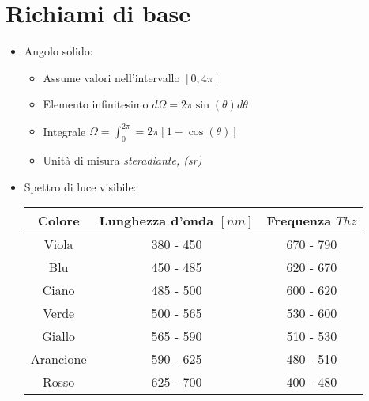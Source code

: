 \documentclass[9pt]{extarticle}
\begin{document}
\section{Richiami di base}
\begin{itemize}
  \item Angolo solido:
        \begin{itemize}
          \item Assume valori nell'intervallo \( [0, 4 \pi] \)
          \item Elemento infinitesimo \( d \Omega = 2 \pi \sin(\theta) d \theta \)
          \item Integrale \( \displaystyle \Omega = \int_0^{2 \pi} = 2 \pi \left[  1- \cos(\theta) \right] \)
          \item Unità di misura \textit{steradiante, (sr)}
        \end{itemize}
  \item Spettro di luce visibile:
        \vspace{0.5cm}
        \begin{table}[h]
          \centering
          \renewcommand{\arraystretch}{2}
          \begin{tabular}{|c|c|c|}
            \hline
            \textbf{Colore} & \textbf{Lunghezza d'onda \([nm]\)} & \textbf{Frequenza \(Thz\)} \\ \hline
            Viola           & 380 - 450                          & 670 - 790                  \\ \hline
            Blu             & 450 - 485                          & 620 - 670                  \\ \hline
            Ciano           & 485 - 500                          & 600 - 620                  \\ \hline
            Verde           & 500 - 565                          & 530 - 600                  \\ \hline
            Giallo          & 565 - 590                          & 510 - 530                  \\ \hline
            Arancione       & 590 - 625                          & 480 - 510                  \\ \hline
            Rosso           & 625 - 700                          & 400 - 480                  \\ \hline
          \end{tabular}
        \end{table}
\end{itemize}
\newpage
\end{document}
